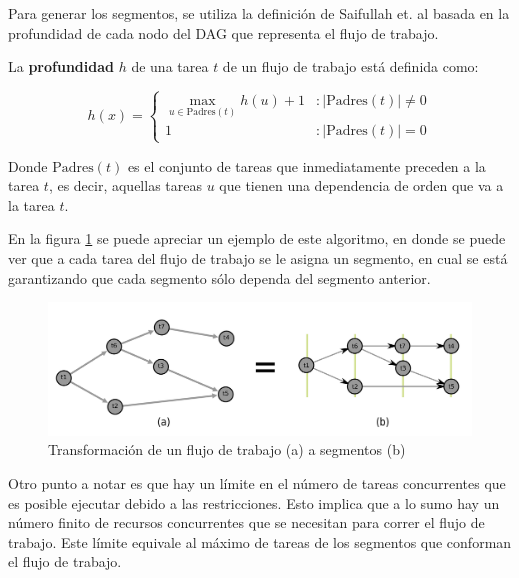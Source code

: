 Para generar los segmentos, se utiliza la definición de Saifullah et. al \cite{saifullah2013multi} basada en la profundidad de cada nodo del DAG que representa el flujo de trabajo.

\begin{defn}

La \textbf{profundidad} $h$ de una tarea $t$ de un flujo de trabajo está definida como:

\begin{displaymath}
h(x) = \left\{
     \begin{array}{lr}
       \max_{u \in \text{Padres}(t) } h(u) + 1 & : | \text{Padres}(t) | \neq 0 \\
       1                                       & : | \text{Padres}(t) | = 0
     \end{array}
   \right.
\end{displaymath}

\noindent Donde $\text{Padres}(t)$ es el conjunto de tareas que inmediatamente preceden a la tarea $t$, es decir, aquellas tareas $u$ que tienen una dependencia de orden que va a la tarea $t$.
\end{defn}

En la figura \ref{fig:DAG_to_segment} se puede apreciar un ejemplo de este algoritmo, en donde se puede ver que a cada tarea del flujo de trabajo se le asigna un segmento, en cual se está garantizando que cada segmento sólo dependa del segmento anterior.

\begin{figure}
\begin{center}
\includegraphics[width=1.0\textwidth]{imagenes/DAG_to_segment.pdf}
\end{center}
\caption{Transformación de un flujo de trabajo (a) a segmentos (b)}
\label{fig:DAG_to_segment}
\end{figure}

Otro punto a notar es que hay un límite en el número de tareas concurrentes que es posible ejecutar debido a las restricciones. Esto implica que a lo sumo hay un número finito de recursos concurrentes que se necesitan para correr el flujo de trabajo. Este límite equivale al máximo de tareas de los segmentos que conforman el flujo de trabajo.

